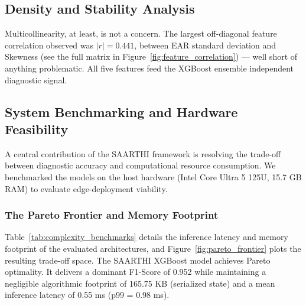 \subsection{Density and Stability Analysis}

Multicollinearity, at least, is not a concern. The largest off-diagonal
feature correlation observed was $|r| = 0.441$, between EAR standard deviation
and Skewness (see the full matrix in
Figure~\ref{fig:feature_correlation}) --- well short of anything problematic.
All five features feed the XGBoost ensemble independent diagnostic signal.

\subsection{System Benchmarking and Hardware Feasibility}

A central contribution of the SAARTHI framework is resolving the trade-off
between diagnostic accuracy and computational resource consumption. We
benchmarked the models on the host hardware (Intel Core Ultra 5 125U, 15.7 GB
RAM) to evaluate edge-deployment viability.

\subsubsection{The Pareto Frontier and Memory Footprint}
Table~\ref{tab:complexity_benchmarks} details the inference latency and memory
footprint of the evaluated architectures, and
Figure~\ref{fig:pareto_frontier} plots the resulting trade-off space. The
SAARTHI XGBoost model achieves Pareto optimality. It delivers a dominant
F1-Score of 0.952 while maintaining a negligible algorithmic footprint of
165.75 KB (serialized state) and a mean inference latency of 0.55 ms
(p99 = 0.98 ms).

\begin{table}[htbp]
\centering
\caption{Algorithmic complexity and hardware benchmarking. SAARTHI achieves
Pareto optimality with high accuracy and a low memory footprint suitable for
edge microcontrollers.}
\label{tab:complexity_benchmarks}
\end{table}

